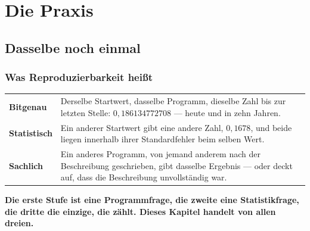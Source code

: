 \part{Die Praxis}

\chapter{Dasselbe noch einmal}

\section{Was Reproduzierbarkeit heißt}

\begin{merksatz}
\begin{center}
{\small
\renewcommand{\arraystretch}{1.5}
\begin{tabular}{@{}P{2.8cm}P{6.0cm}@{}}
\toprule
\textbf{Bitgenau} & Derselbe Startwert, dasselbe Programm, dieselbe Zahl bis zur letzten Stelle: $0{,}186134772708$ --- heute und in zehn Jahren.\\
\textbf{Statistisch} & Ein anderer Startwert gibt eine andere Zahl, $0{,}1678$, und beide liegen innerhalb ihrer Standardfehler beim selben Wert.\\
\textbf{Sachlich} & Ein anderes Programm, von jemand anderem nach der Beschreibung geschrieben, gibt dasselbe Ergebnis --- oder deckt auf, dass die Beschreibung unvollständig war.\\
\bottomrule
\end{tabular}}
\end{center}

\begin{center}
\begin{minipage}{0.9\textwidth}
\textbf{Die erste Stufe ist eine Programmfrage, die zweite eine Statistikfrage, die dritte die einzige, die zählt. Dieses Kapitel handelt von allen dreien.}
\end{minipage}
\end{center}

\begin{center}
\begin{minipage}{0.88\textwidth}
\end{minipage}
\end{center}
\end{merksatz}

